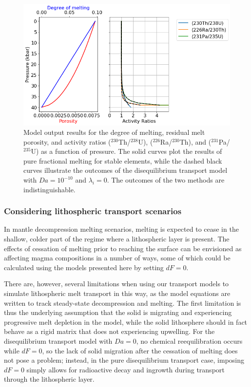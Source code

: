 \documentclass[draft]{agujournal2019}
\begin{document}
\begin{figure}[H]
	\noindent\includegraphics[width=\textwidth]{Figure_7.png}
	\caption{Model output results for the degree of melting, residual melt porosity, and activity ratios ($^{230}$Th/$^{238}$U), ($^{226}$Ra/$^{230}$Th), and ($^{231}$Pa/$^{235}$U) as a function of pressure. The solid curves plot the results of pure fractional melting for stable elements, while the dashed black curves illustrate the outcomes of the disequilibrium transport model with $Da=10^{-10}$ and $\lambda_i=0$. The outcomes of the two methods are indistinguishable.}
	\label{output-fractional}
\end{figure}


\subsubsection{Considering lithospheric transport scenarios}

In mantle decompression melting scenarios, melting is expected to cease in the shallow, colder part of the regime where a lithospheric layer is present. The effects of cessation of melting prior to reaching the surface can be envisioned as affecting magma compositions in a number of ways, some of which could be calculated using the models presented here by setting $dF=0$.

There are, however, several limitations when using our transport models to simulate lithospheric melt transport in this way, as the model equations are written to track steady-state decompression and melting. The first limitation is thus the underlying assumption that the solid is migrating and experiencing progressive melt depletion in the model, while the solid lithosphere should in fact behave as a rigid matrix that does not experiencing upwelling. For the disequilibrium transport model with $Da=0$, no chemical reequilibration occurs while $dF=0$, so the lack of solid migration after the cessation of melting does not pose a problem; instead, in the pure disequilibrium transport case, imposing $dF=0$ simply allows for radioactive decay and ingrowth during transport through the lithospheric layer.
\end{document}
